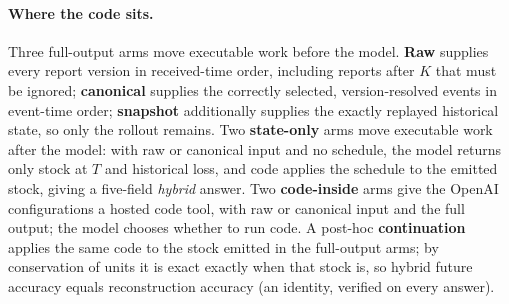 \documentclass{article}
\begin{document}
\paragraph{Where the code sits.}
Three full-output arms move executable work before the model. \textbf{Raw} supplies every
report version in received-time order, including reports after $K$ that must be ignored;
\textbf{canonical} supplies the correctly selected, version-resolved events in event-time
order; \textbf{snapshot} additionally supplies the exactly replayed historical state, so
only the rollout remains. Two \textbf{state-only} arms move executable work after the
model: with raw or canonical input and no schedule, the model returns only stock at $T$ and
historical loss, and code applies the schedule to the emitted stock, giving a five-field
\emph{hybrid} answer. Two \textbf{code-inside} arms give the OpenAI configurations a hosted code tool, with raw or
canonical input and the full output; the model chooses whether to run code. A post-hoc \textbf{continuation} applies the same code to the stock emitted in the full-output
arms; by conservation of units it is exact exactly when that stock is, so hybrid future
accuracy equals reconstruction accuracy (an identity, verified on every answer).
\end{document}
